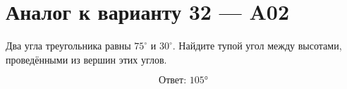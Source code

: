


\section*{Аналог к варианту 32 — A02}
Два угла треугольника равны \(75^\circ\) и \(30^\circ\). Найдите тупой угол между высотами, проведёнными из вершин этих углов.
\begin{center}\figTriangleAltitudes\end{center}
\[\boxed{\text{Ответ: }105°}\]

